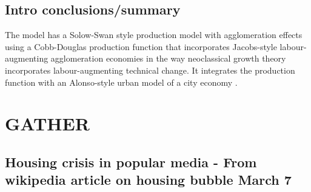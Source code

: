 \section{Intro conclusions/summary}
The model has a Solow-Swan style production model with agglomeration effects using a \gls{Cobb-Douglas} production function that incorporates Jacobs-style labour-augmenting agglomeration economies %
in the way neoclassical growth theory incorporates labour-augmenting technical change.
It integrates the production function with an Alonso-style urban model of a city economy \cite{alonzoTheoryUrbanLand1960}.


\chapter{GATHER}
\section{Housing crisis in popular media - From wikipedia article on housing bubble March 7}


